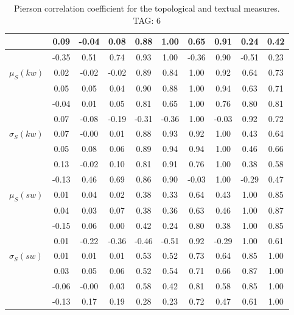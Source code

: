 \begin{table*}[h!]
\begin{center}
\begin{tabular}{| l | c | c | c | c | c | c | c | c | c |}
 & 0.09  & -0.04  & 0.08  & 0.88  & 1.00  & 0.65  & 0.91  & 0.24  & 0.42 \\\hline
 & -0.35  & 0.51  & 0.74  & 0.93  & 1.00  & -0.36  & 0.90  & -0.51  & 0.23 \\\hline
$\mu_S(kw)$ & 0.02  & -0.02  & -0.02  & 0.89  & 0.84  & 1.00  & 0.92  & 0.64  & 0.73 \\\hline
 & 0.05  & 0.05  & 0.04  & 0.90  & 0.88  & 1.00  & 0.94  & 0.63  & 0.71 \\\hline
 & -0.04  & 0.01  & 0.05  & 0.81  & 0.65  & 1.00  & 0.76  & 0.80  & 0.81 \\\hline
 & 0.07  & -0.08  & -0.19  & -0.31  & -0.36  & 1.00  & -0.03  & 0.92  & 0.72 \\\hline
$\sigma_S(kw)$ & 0.07  & -0.00  & 0.01  & 0.88  & 0.93  & 0.92  & 1.00  & 0.43  & 0.64 \\\hline
 & 0.05  & 0.08  & 0.06  & 0.89  & 0.94  & 0.94  & 1.00  & 0.46  & 0.66 \\\hline
 & 0.13  & -0.02  & 0.10  & 0.81  & 0.91  & 0.76  & 1.00  & 0.38  & 0.58 \\\hline
 & -0.13  & 0.46  & 0.69  & 0.86  & 0.90  & -0.03  & 1.00  & -0.29  & 0.47 \\\hline
$\mu_S(sw)$ & 0.01  & 0.04  & 0.02  & 0.38  & 0.33  & 0.64  & 0.43  & 1.00  & 0.85 \\\hline
 & 0.04  & 0.03  & 0.07  & 0.38  & 0.36  & 0.63  & 0.46  & 1.00  & 0.87 \\\hline
 & -0.15  & 0.06  & 0.00  & 0.42  & 0.24  & 0.80  & 0.38  & 1.00  & 0.85 \\\hline
 & 0.01  & -0.22  & -0.36  & -0.46  & -0.51  & 0.92  & -0.29  & 1.00  & 0.61 \\\hline
$\sigma_S(sw)$ & 0.01  & 0.01  & 0.01  & 0.53  & 0.52  & 0.73  & 0.64  & 0.85  & 1.00 \\\hline
 & 0.03  & 0.05  & 0.06  & 0.52  & 0.54  & 0.71  & 0.66  & 0.87  & 1.00 \\\hline
 & -0.06  & -0.00  & 0.03  & 0.58  & 0.42  & 0.81  & 0.58  & 0.85  & 1.00 \\\hline
 & -0.13  & 0.17  & 0.19  & 0.28  & 0.23  & 0.72  & 0.47  & 0.61  & 1.00 \\\hline
\end{tabular}
\caption{Pierson correlation coefficient for the topological and textual measures. TAG: 6}
\end{center}
\end{table*}